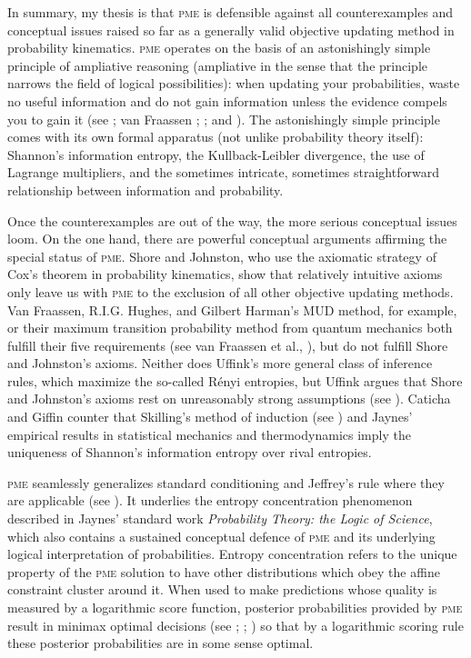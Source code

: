 \documentclass[phd,12pt,oneside]{ubcthesis}
\begin{document}
In summary, my thesis is that \textsc{pme} is defensible against all
counterexamples and conceptual issues raised so far as a generally
valid objective updating method in probability kinematics.
\textsc{pme} operates on the basis of an astonishingly simple
principle of ampliative reasoning (ampliative in the sense that the
principle narrows the field of logical possibilities): when updating
your probabilities, waste no useful information and do not gain
information unless the evidence compels you to gain it (see
; van Fraassen
; ; and
). The astonishingly simple principle comes with
its own formal apparatus (not unlike probability theory itself):
Shannon's information entropy, the Kullback-Leibler divergence, the
use of Lagrange multipliers, and the sometimes intricate, sometimes
straightforward relationship between information and probability.

Once the counterexamples are out of the way, the more serious
conceptual issues loom. On the one hand, there are powerful conceptual
arguments affirming the special status of \textsc{pme}. Shore and
Johnston, who use the axiomatic strategy of Cox's theorem in
probability kinematics, show that relatively intuitive axioms only
leave us with \textsc{pme} to the exclusion of all other objective
updating methods. Van Fraassen, R.I.G. Hughes, and Gilbert Harman's
MUD method, for example, or their maximum transition probability
method from quantum mechanics both fulfill their five requirements
(see van Fraassen et al., ), but do not
fulfill Shore and Johnston's axioms. Neither does Uffink's more
general class of inference rules, which maximize the so-called
R{\'e}nyi entropies, but Uffink argues that Shore and Johnston's
axioms rest on unreasonably strong assumptions (see
). Caticha and Giffin counter that Skilling's
method of induction (see ) and Jaynes'
empirical results in statistical mechanics and thermodynamics imply
the uniqueness of Shannon's information entropy over rival entropies.

\textsc{pme} seamlessly generalizes standard conditioning and
Jeffrey's rule where they are applicable (see
). It underlies the entropy concentration
phenomenon described in Jaynes' standard work \emph{Probability
  Theory: the Logic of Science}, which also contains a sustained
conceptual defence of \textsc{pme} and its underlying logical
interpretation of probabilities. Entropy concentration refers to the
unique property of the \textsc{pme} solution to have other
distributions which obey the affine constraint cluster around it. When
used to make predictions whose quality is measured by a logarithmic
score function, posterior probabilities provided by \textsc{pme}
result in minimax optimal decisions (see ;
; ) so that by a
logarithmic scoring rule these posterior probabilities are in some
sense optimal.
\end{document}
